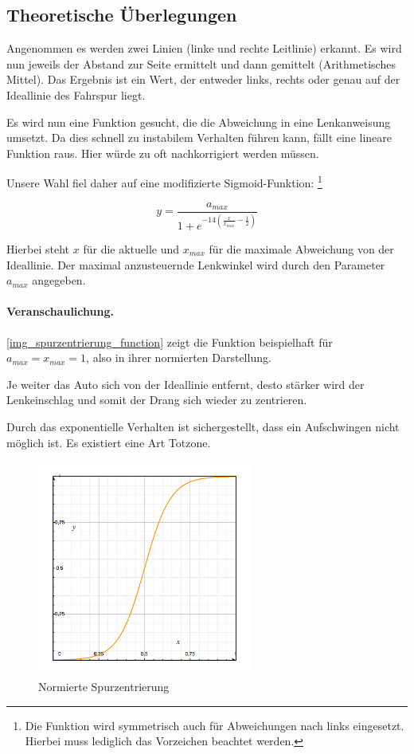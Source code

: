 \documentclass[a4paper,12pt]{report}
\begin{document}
\subsection{Theoretische Überlegungen}

	Angenommen es werden zwei Linien (linke und rechte Leitlinie) erkannt.
	Es wird nun jeweils der Abstand zur Seite ermittelt und dann gemittelt (Arithmetisches Mittel).
	Das Ergebnis ist ein Wert, der entweder links, rechts oder genau auf der Ideallinie des Fahrspur liegt.
	
	Es wird nun eine Funktion gesucht, die die Abweichung in eine Lenkanweisung umsetzt.
	Da dies schnell zu instabilem Verhalten führen kann, fällt eine lineare Funktion raus.
	Hier würde zu oft nachkorrigiert werden müssen.
	
	Unsere Wahl fiel daher auf eine modifizierte Sigmoid-Funktion:
	\footnote{Die Funktion wird symmetrisch auch für Abweichungen nach links eingesetzt. Hierbei muss lediglich das Vorzeichen beachtet werden.}
	
		\[y=\frac{a_{max}}{1 + e^{-14\left( \frac{x}{x_{max}} - \frac{1}{2} \right)}}\]
	
	Hierbei steht $x$ für die aktuelle und $x_{max}$ für die maximale Abweichung von der Ideallinie.
	Der maximal anzusteuernde Lenkwinkel wird durch den Parameter $a_{max}$ angegeben.
	
	\paragraph{Veranschaulichung.} \autoref{img_spurzentrierung_function} zeigt die Funktion beispielhaft für $a_{max} = x_{max} = 1$, also in ihrer normierten Darstellung.
	
	Je weiter das Auto sich von der Ideallinie entfernt, desto stärker wird der Lenkeinschlag und somit der Drang sich wieder zu zentrieren.
	
	Durch das exponentielle Verhalten ist sichergestellt, dass ein Aufschwingen nicht möglich ist. Es existiert eine Art Totzone.
	
	\begin{figure}[ht]
		\centering
		\includegraphics[width=200pt,keepaspectratio]{assets/spurzentrierung}
		\caption{Normierte Spurzentrierung}
		\label{img_spurzentrierung_function}
	\end{figure}
	
	
\end{document}
